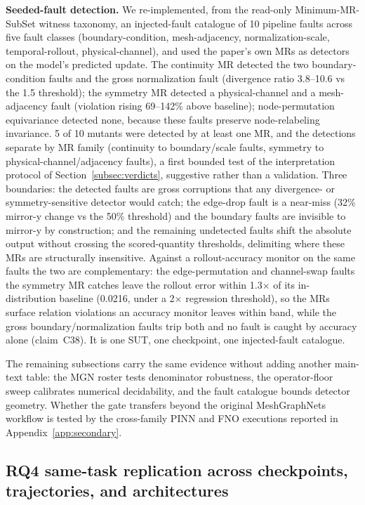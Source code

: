 \documentclass[preprint,12pt]{elsarticle}
\begin{document}
\textbf{Seeded-fault detection.} We re-implemented, from the read-only Minimum-MR-SubSet witness taxonomy, an injected-fault catalogue of 10 pipeline faults across five fault classes (boundary-condition, mesh-adjacency, normalization-scale, temporal-rollout, physical-channel), and used the paper's own MRs as detectors on the model's predicted update. The continuity MR detected the two boundary-condition faults and the gross normalization fault (divergence ratio 3.8--10.6 vs the 1.5 threshold); the symmetry MR detected a physical-channel and a mesh-adjacency fault (violation rising 69--142\% above baseline); node-permutation equivariance detected none, because these faults preserve node-relabeling invariance. 5 of 10 mutants were detected by at least one MR, and the detections separate by MR family (continuity to boundary/scale faults, symmetry to physical-channel/adjacency faults), a first bounded test of the interpretation protocol of Section~\ref{subsec:verdicts}, suggestive rather than a validation. Three boundaries: the detected faults are gross corruptions that any divergence- or symmetry-sensitive detector would catch; the edge-drop fault is a near-miss (32\% mirror-y change vs the 50\% threshold) and the boundary faults are invisible to mirror-y by construction; and the remaining undetected faults shift the absolute output without crossing the scored-quantity thresholds, delimiting where these MRs are structurally insensitive. Against a rollout-accuracy monitor on the same faults the two are complementary: the edge-permutation and channel-swap faults the symmetry MR catches leave the rollout error within 1.3$\times$ of its in-distribution baseline (0.0216, under a 2$\times$ regression threshold), so the MRs surface relation violations an accuracy monitor leaves within band, while the gross boundary/normalization faults trip both and no fault is caught by accuracy alone (claim~C38). It is one SUT, one checkpoint, one injected-fault catalogue.

The remaining subsections carry the same evidence without adding another main-text table: the MGN roster tests denominator robustness, the operator-floor sweep calibrates numerical decidability, and the fault catalogue bounds detector geometry. Whether the gate transfers beyond the original MeshGraphNets workflow is tested by the cross-family PINN and FNO executions reported in Appendix~\ref{app:secondary}.

\subsection{RQ4 same-task replication across checkpoints, trajectories, and architectures}
\label{subsec:multicheckpoint-replication}
\end{document}
